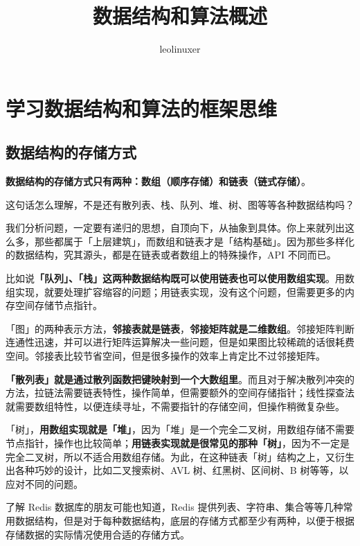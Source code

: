 \documentclass[12pt]{article}
\title{数据结构和算法概述}
\author{leolinuxer}
\begin{document}
\maketitle
\tableofcontents

\section{学习数据结构和算法的框架思维\cite{F_Algorithm_Mind_Framework}}
\subsection{数据结构的存储方式}
\textbf{数据结构的存储方式只有两种：数组（顺序存储）和链表（链式存储）}。

这句话怎么理解，不是还有散列表、栈、队列、堆、树、图等等各种数据结构吗？

我们分析问题，一定要有递归的思想，自顶向下，从抽象到具体。你上来就列出这么多，那些都属于「上层建筑」，而数组和链表才是「结构基础」。因为那些多样化的数据结构，究其源头，都是在链表或者数组上的特殊操作，API 不同而已。

比如说\textbf{「队列」、「栈」这两种数据结构既可以使用链表也可以使用数组实现}。用数组实现，就要处理扩容缩容的问题；用链表实现，没有这个问题，但需要更多的内存空间存储节点指针。

「图」的两种表示方法，\textbf{邻接表就是链表}，\textbf{邻接矩阵就是二维数组}。邻接矩阵判断连通性迅速，并可以进行矩阵运算解决一些问题，但是如果图比较稀疏的话很耗费空间。邻接表比较节省空间，但是很多操作的效率上肯定比不过邻接矩阵。

\textbf{「散列表」就是通过散列函数把键映射到一个大数组里}。而且对于解决散列冲突的方法，拉链法需要链表特性，操作简单，但需要额外的空间存储指针；线性探查法就需要数组特性，以便连续寻址，不需要指针的存储空间，但操作稍微复杂些。

「树」，\textbf{用数组实现就是「堆」}，因为「堆」是一个完全二叉树，用数组存储不需要节点指针，操作也比较简单；\textbf{用链表实现就是很常见的那种「树」}，因为不一定是完全二叉树，所以不适合用数组存储。为此，在这种链表「树」结构之上，又衍生出各种巧妙的设计，比如二叉搜索树、AVL 树、红黑树、区间树、B 树等等，以应对不同的问题。

了解 Redis 数据库的朋友可能也知道，Redis 提供列表、字符串、集合等等几种常用数据结构，但是对于每种数据结构，底层的存储方式都至少有两种，以便于根据存储数据的实际情况使用合适的存储方式。
\end{document}
